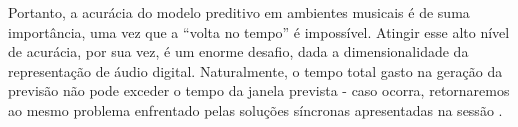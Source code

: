 Portanto, a acurácia do modelo preditivo em ambientes musicais é de suma importância, uma vez que a ``volta no tempo'' é impossível. Atingir esse alto nível de acurácia, por sua vez, é um enorme desafio, dada a dimensionalidade da representação de áudio digital. Naturalmente, o tempo total gasto na geração da previsão não pode exceder o tempo da janela prevista - caso ocorra, retornaremos ao mesmo problema enfrentado pelas soluções síncronas apresentadas na sessão .
